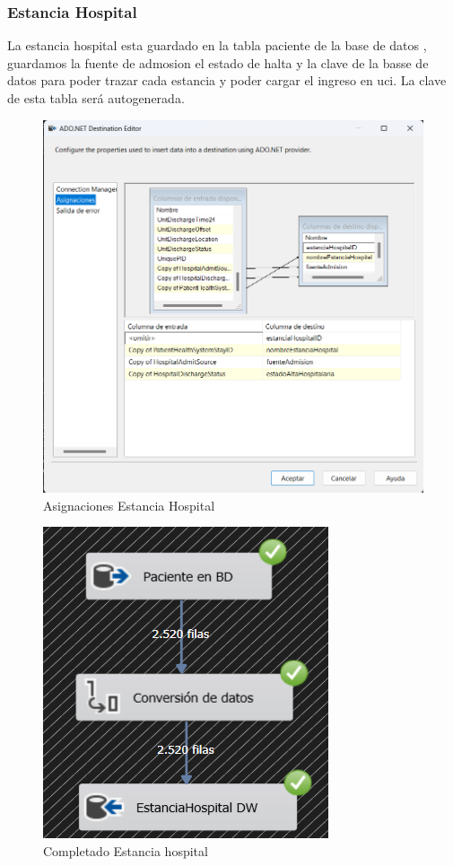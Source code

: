 \documentclass{article}
\begin{document}
	\subsubsection{Estancia Hospital}
	La estancia hospital esta guardado en la tabla paciente de la base de datos , guardamos la fuente de admosion el estado de halta y la clave de la basse de datos para poder trazar cada estancia y poder cargar el ingreso en uci. La clave de esta tabla será autogenerada.
		\begin{figure}[H]
		\centering
		\includegraphics[width=.7\linewidth]{./images/asignaciones/estancia_hospital.png}
		\caption{Asignaciones Estancia Hospital}
	\end{figure}


	\begin{figure}[H]
		\centering
		\includegraphics[width=.3\linewidth]{./images/completados/estancia_hospital.png}
		\caption{Completado Estancia hospital}
	\end{figure}
\end{document}

